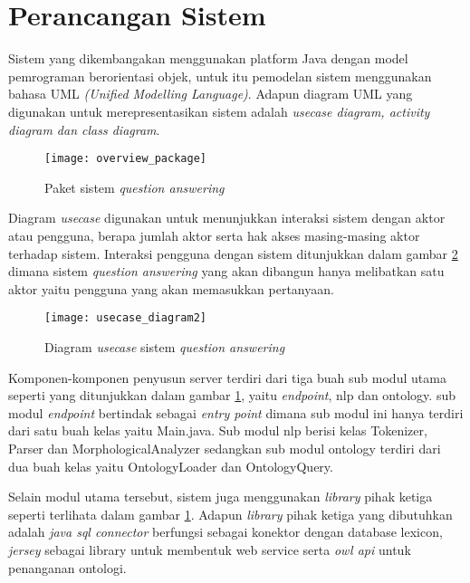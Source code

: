 \section{Perancangan Sistem}
Sistem yang dikembangakan menggunakan platform Java dengan model pemrograman berorientasi objek, untuk itu pemodelan sistem menggunakan bahasa UML \emph{(Unified Modelling Language)}. Adapun diagram UML yang digunakan untuk merepresentasikan sistem adalah \emph{usecase diagram, activity diagram dan class diagram}.

\begin{figure}[hb]
    \centering
    \texttt{[image: overview\_package]}
    \caption{Paket sistem \emph{question answering}}
    \label{fig:overview_package}
\end{figure}

Diagram \emph{usecase} digunakan untuk menunjukkan interaksi sistem dengan aktor atau pengguna, berapa jumlah aktor serta hak akses masing-masing aktor terhadap sistem. Interaksi pengguna dengan sistem ditunjukkan dalam gambar \ref{fig:usecase_diagram} dimana sistem \emph{question answering} yang akan dibangun hanya melibatkan satu aktor yaitu pengguna yang akan memasukkan pertanyaan.

\begin{figure}[t]
    \centering
    \texttt{[image: usecase\_diagram2]}
    \caption{Diagram \emph{usecase} sistem \emph{question answering}}
    \label{fig:usecase_diagram}
\end{figure}

Komponen-komponen penyusun server terdiri dari tiga buah sub modul utama seperti yang ditunjukkan dalam gambar \ref{fig:overview_package}, yaitu \emph{endpoint}, nlp dan ontology. sub modul \emph{endpoint} bertindak sebagai \emph{entry point} dimana sub modul ini hanya terdiri dari satu buah kelas yaitu Main.java. Sub modul nlp berisi kelas Tokenizer, Parser dan MorphologicalAnalyzer sedangkan sub modul ontology terdiri dari dua buah kelas yaitu OntologyLoader dan OntologyQuery.

Selain modul utama tersebut, sistem juga menggunakan \emph{library} pihak ketiga seperti terlihata dalam gambar \ref{fig:overview_package}. Adapun \emph{library} pihak ketiga yang dibutuhkan adalah \emph{java sql connector} berfungsi sebagai konektor dengan database lexicon, \emph{jersey} sebagai library untuk membentuk web service serta \emph{owl api} untuk penanganan ontologi.

